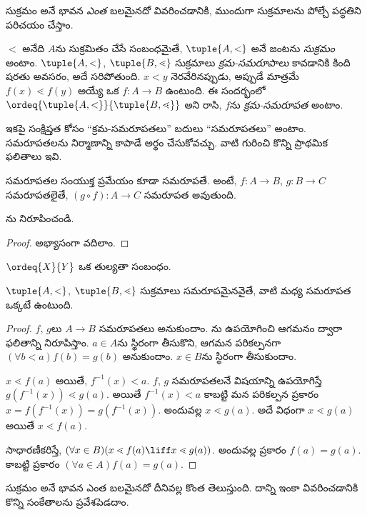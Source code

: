 \documentclass[../../../include/open-logic-section]{subfiles}
\begin{document}

సుక్రమం అనే భావన \emph{ఎంత} బలమైనదో వివరించడానికి,
ముందుగా సుక్రమాలను పోల్చే పద్ధతిని పరిచయం చేస్తాం.

\begin{defn}
$<$ అనేది $A$ను సుక్రమితం చేసే
సంబంధమైతే, $\tuple{A, <}$ అనే జంటను
\emph{సుక్రమం} అంటాం.
$\tuple{A, <}$,
$\tuple{B,
\lessdot}$ సుక్రమాలు
\emph{క్రమ-సమరూపాలు} కావడానికి కింది షరతు అవసరం, అదే సరిపోతుంది.
$x < y$ నెరవేరినప్పుడు,
అప్పుడే మాత్రమే $f(x) \lessdot  f(y)$
అయ్యే ఒక
$f \colon A \to B$
ఉంటుంది. ఈ సందర్భంలో
$\ordeq{\tuple{A, <}}{\tuple{B, \lessdot}}$
అని రాసి, $f$ను
\emph{క్రమ-సమరూపత}
అంటాం.
\end{defn}
\noindent
ఇకపై సంక్షిప్తత కోసం
``క్రమ-సమరూపతలు'' బదులు
``సమరూపతలు'' అంటాం.
సమరూపతలను నిర్మాణాన్ని కాపాడే
 అర్థం చేసుకోవచ్చు.
వాటి గురించి కొన్ని ప్రాథమిక ఫలితాలు ఇవి.

\begin{lem}
సమరూపతల సంయుక్త ప్రమేయం కూడా సమరూపతే. అంటే,
$f \colon A
\to B$, $g \colon B \to C$
సమరూపతలైతే,
$(g \circ f)
\colon A \to C$
సమరూపత అవుతుంది.
\end{lem}
\begin{prob}
	ను నిరూపించండి.
\end{prob}
\begin{proof}
అభ్యాసంగా వదిలాం.
\end{proof}
\begin{cor}
	$\ordeq{X}{Y}$ ఒక
	తుల్యతా సంబంధం.
\end{cor}
\begin{prop}
$\tuple{A, <}$,
$\tuple{B, \lessdot}$
సుక్రమాలు సమరూపమైనవైతే,
వాటి మధ్య సమరూపత
ఒక్కటే ఉంటుంది.
\end{prop}

\begin{proof}
$f$, $g$లు $A \to B$
సమరూపతలు అనుకుందాం.
ను
ఉపయోగించి ఆగమనం
ద్వారా ఫలితాన్ని
నిరూపిస్తాం. $a\in A$ను
స్థిరంగా తీసుకొని, ఆగమన
పరికల్పనగా
$(\forall b < a)f(b) = g(b)$
అనుకుందాం. $x \in B$ను
స్థిరంగా తీసుకుందాం.

$x \lessdot f(a)$ అయితే,
$f^{-1}(x) < a$. $f$,
$g$ సమరూపతలనే
విషయాన్ని ఉపయోగిస్తే
$g(f^{-1}(x)) \lessdot
g(a)$. అయితే
$f^{-1}(x) < a$
కాబట్టి మన పరికల్పన
ప్రకారం
$x =f(f^{-1}(x)) = g(f^{-1}(x))$.
అందువల్ల $x \lessdot g(a)$.
అదే విధంగా
$x \lessdot g(a)$ అయితే
$x \lessdot f(a)$.

సాధారణీకరిస్తే,
$(\forall x \in B)(x \lessdot f(a) \liff x \lessdot
g(a))$. అందువల్ల
ప్రకారం $f(a) = g(a)$.
కాబట్టి
ప్రకారం
$(\forall
a \in A)f(a) = g(a)$.
\end{proof}\noindent
సుక్రమం అనే భావన ఎంత బలమైనదో దీనివల్ల కొంత తెలుస్తుంది.
దాన్ని ఇంకా వివరించడానికి కొన్ని సంకేతాలను ప్రవేశపెడదాం.
\end{document}
